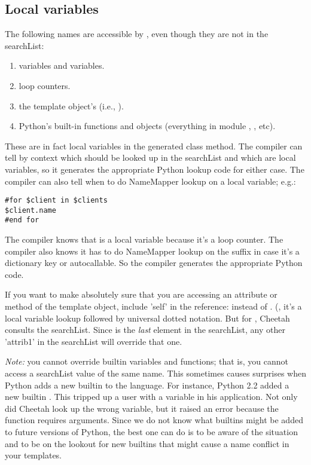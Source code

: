\subsection{Local variables}
\label{language.localVariables}

The following names are accessible by , even though they
are not in the searchList:  

\begin{enumerate}
\item {} variables and  variables.
\item {} loop counters.
\item the template object's  (i.e., ).
\item Python's built-in functions and objects (everything in module
     , , etc).
\end{enumerate}

These are in fact local variables in the generated class method.  The compiler
can tell by context which  should be looked up in the
searchList and which are local variables, so it generates the appropriate
Python lookup code for either case.  The compiler can also tell when to do
NameMapper lookup on a local variable; e.g.:
\begin{verbatim}
#for $client in $clients 
$client.name
#end for
\end{verbatim}
The compiler knows that  is a local variable because it's a
 loop counter.  The compiler also knows it has to do NameMapper
lookup on the  suffix in case it's a dictionary key or 
autocallable.  So the compiler generates the appropriate Python code.

If you want to make absolutely sure that you are accessing an attribute or
method of the template object, include 'self' in the reference:
 instead of .  (, it's
a local variable lookup followed by universal dotted notation.  But for
, Cheetah consults the searchList.  Since  is the
{\em last} element in the searchList, any other 'attrib1' in the searchList
will override that one.

{\em Note:} you cannot override builtin variables and functions; that is, you
cannot access a searchList value of the same name.  This sometimes causes
surprises when Python adds a new builtin to the language.  For instance, Python
2.2 added a new builtin .  This tripped up a user with a 
 variable in his application.  Not only did Cheetah look up
the wrong variable, but it raised an error because the  function
requires arguments.  Since we do not know what builtins might be added to future
versions of Python, the best one can do is to be aware of the situation and to
be on the lookout for new builtins that might cause a name conflict in your
templates.

